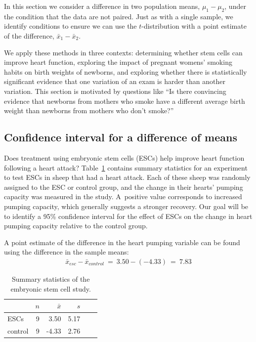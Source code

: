 {
In this section we consider a difference in two population means, $\mu_1 - \mu_2$, under the condition that the data are not paired. Just as with a single sample, we identify conditions to ensure we can use the $t$-distribution with a point estimate of the difference, $\bar{x}_1 - \bar{x}_2$.

We apply these methods in three contexts: determining whether stem cells can improve heart function, exploring the impact of pregnant womens' smoking habits on birth weights of newborns, and exploring whether there is statistically significant evidence that one variation of an exam is harder than another variation. This section is motivated by questions like ``Is there convincing evidence that newborns from mothers who smoke have a different average birth weight than newborns from mothers who don't smoke?''

\subsection{Confidence interval for a difference of means}


Does treatment using embryonic stem cells (ESCs) help improve heart function following a heart attack? Table~\ref{summaryStatsForSheepHeartDataWhoReceivedMiceESCs} contains summary statistics for an experiment to test ESCs in sheep that had a heart attack. Each of these sheep was randomly assigned to the ESC or control group, and the change in their hearts' pumping capacity was measured in the study. A~positive value corresponds to increased pumping capacity, which generally suggests a stronger recovery. Our goal will be to identify a 95\% confidence interval for the effect of ESCs on the change in heart pumping capacity relative to the control group.

A point estimate of the difference in the heart pumping variable can be found using the difference in the sample means:
\begin{eqnarray*}
\bar{x}_{esc} - \bar{x}_{control}\ =\ 3.50 - (-4.33)\ =\ 7.83
\end{eqnarray*}

\begin{table}[h]
\centering
\begin{tabular}{l rrrrr}
\hline
\hspace{10mm}	& $n$	& $\bar{x}$	& $s$  	 \\
\hline
ESCs		& 9		& 3.50		& 5.17  	\\
control		& 9		& -4.33		& 2.76  	 \\
\hline
\end{tabular}
\caption{Summary statistics of the embryonic stem cell study.}
\label{summaryStatsForSheepHeartDataWhoReceivedMiceESCs}
\end{table}

}
